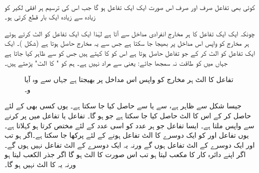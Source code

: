 \\
کوئی بھی تفاعل  صرف اور صرف اس صورت ایک ایک تفاعل ہو گا جب اس کی ترسیم ہر افقی لکیر کو زیادہ سے زیادہ ایک بار قطع کرتی ہو۔ 

چونکہ ایک ایک تفاعل کا ہر مخارج  انفرادی مداخل  سے آتا ہے لہٰذا ایک ایک تفاعل کو الٹ کرتے ہوئے ہر مخارج کو واپس اس مداخل پر بھیجا جا سکتا ہے جس سے یہ مخارج حاصل ہوتا ہے (شکل )۔ ایک ایک تفاعل  کو الٹ کر کے جو تفاعل حاصل ہوتا ہے اس کو  کا  کہتے ہیں جس کو  سے ظاہر کیا جاتا ہے جہاں  میں  کو طاقت نہ سمجھا جائے: یعنی  سے مراد  نہیں ہے۔ ہم  کو " کا الٹ" پڑھتے ہیں۔
\begin{figure}
\centering
{}
\caption{
تفاعل  کا الٹ ہر مخارج کو واپس اس مداخل پر بھیجتا ہے جہاں سے وہ آیا و۔
}
\label{شکل_ماورائی_الٹ_واپس_بھیجتا_ہے}
\end{figure}

جیسا شکل  سے ظاہر ہے،  سے  یا  سے  حاصل کیا جا سکتا ہے۔ یوں کسی بھی  کے لئے  حاصل کر کے اس  کا الٹ  حاصل کیا جا سکتا ہے جو  ہو گا۔ تفاعل  یا تفاعل  میں  پر کرنے سے واپس  ملتا ہے۔ ایسا تفاعل جو ہر عدد کو اسی عدد کے لئے مختص کرتا ہو   کہلاتا ہے۔ یوں تفاعل  اور  کو ایک دوسرے  کا الٹ تفاعل ہونے کے لئے پرکھا جا سکتا ہے۔اگر  ہو تب  اور  ایک دوسرے کے الٹ تفاعل ہوں گے ورنہ یہ ایک دوسرے کے الٹ تفاعل نہیں ہوں گے۔ اگر  اپنے دائرہ کار کا مکعب لیتا ہو تب  اس صورت  کا الٹ ہو گا اگر  جذر الکعب لیتا ہو ورنہ یہ  کا الٹ نہیں ہو گا۔

